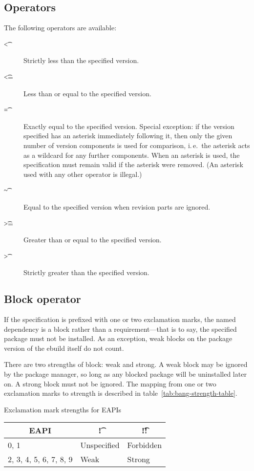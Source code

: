 \subsection{Operators}
\label{sec:dep-operator}

The following operators are available:

\begin{description}
\item[\t{<}] Strictly less than the specified version.
\item[\t{<=}] Less than or equal to the specified version.
\item[\t{=}] Exactly equal to the specified version. Special exception: if the version specified
    has an asterisk immediately following it, then only the given number of version components
    is used for comparison, i.\,e.\ the asterisk acts as a wildcard for any further components.
    When an asterisk is used, the specification must remain valid if the asterisk were removed.
    (An asterisk used with any other operator is illegal.)
\item[\t{\textasciitilde}] Equal to the specified version when revision parts are ignored.
\item[\t{>=}] Greater than or equal to the specified version.
\item[\t{>}] Strictly greater than the specified version.
\end{description}

\subsection{Block operator}

If the specification is prefixed with one or two exclamation marks, the named dependency is a block
rather than a requirement---that is to say, the specified package must not be installed. As an
exception, weak blocks on the package version of the ebuild itself do not count.

 There are two strengths of block: weak and strong. A weak block may be
ignored by the package manager, so long as any blocked package will be uninstalled later on. A
strong block must not be ignored. The mapping from one or two exclamation marks to strength is
described in table~\ref{tab:bang-strength-table}.

\begin{centertable}{Exclamation mark strengths for EAPIs}
    \label{tab:bang-strength-table}
    \begin{tabular}{lll}
      \toprule
      \multicolumn{1}{c}{\textbf{EAPI}} &
      \multicolumn{1}{c}{\textbf{\t{!}}} &
      \multicolumn{1}{c}{\textbf{\t{!!}}} \\
      \midrule
      0, 1                    & Unspecified & Forbidden \\
      2, 3, 4, 5, 6, 7, 8, 9  & Weak        & Strong    \\
      \bottomrule
    \end{tabular}
\end{centertable}

